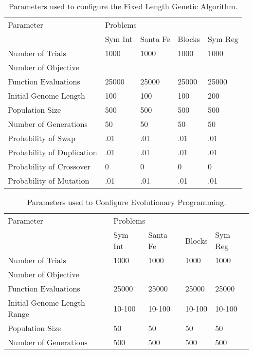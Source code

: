 \begin{table}[h]
\begin{center}
\begin{tabular}{|l|l|l|l|l|}
\hline
Parameter &\multicolumn{4}{l|}{Problems}\\
\cline{2-1} \cline{3-1} \cline{4-1} \cline{5-1} 
 & Sym Int & Santa Fe & Blocks & Sym Reg  \\
\hline
Number of Trials & 1000 & 1000 & 1000 & 1000 \\
Number of Objective & & & & \\ 
Function Evaluations  & 25000 & 25000 & 25000 & 25000  \\
Initial Genome Length  & 100 & 100 & 100 & 200  \\
Population Size  & 500 & 500 & 500 & 500  \\
Number of Generations  & 50 & 50 & 50 & 50  \\
Probability of Swap  & .01  & .01  & .01 & .01   \\
Probability of Duplication   & .01  & .01  & .01 & .01  \\
Probability of Crossover & 0  & 0  & 0 & 0  \\
Probability of Mutation & .01  & .01  & .01 & .01  \\
\hline
\end{tabular}
\caption{\label{ga_fixed_param_table} Parameters used to configure the Fixed Length Genetic Algorithm.}
\end{center}
\end{table}



\begin{table}[h]
\begin{center}
\begin{tabular}{|l|l|l|l|l|}
\hline
Parameter &\multicolumn{4}{l|}{Problems}\\
\cline{2-1} \cline{3-1} \cline{4-1} \cline{5-1} 
 & Sym Int & Santa Fe & Blocks & Sym Reg \\
\hline
Number of Trials & 1000 & 1000 & 1000 & 1000  \\
Number of Objective & & & & \\ 
Function Evaluations  & 25000 & 25000 & 25000 & 25000  \\
Initial Genome Length Range & 10-100 & 10-100 & 10-100 & 10-100  \\
Population Size  & 50 & 50 & 50 & 50  \\
Number of Generations  & 500 & 500 & 500 & 500  \\
\hline
\end{tabular}
\caption{\label{ep_variable_param_table} Parameters used to Configure Evolutionary Programming.}
\end{center}
\end{table}

